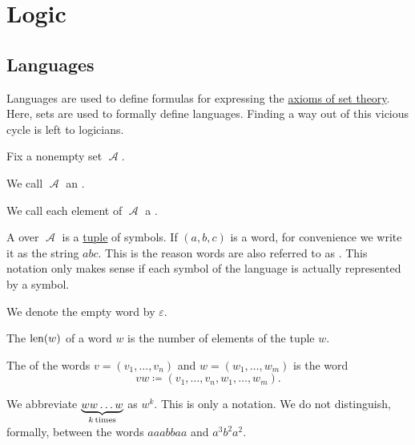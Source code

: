 \section{Logic}\label{sec:logic}
\subsection{Languages}\label{subsec:languages}

\begin{remark}\label{rem:language_definitions_using_sets}
  Languages are used to define formulas for expressing the \hyperref[def:set_zfc]{axioms of set theory}. Here, sets are used to formally define languages. Finding a way out of this vicious cycle is left to logicians.
\end{remark}

\begin{definition}\label{def:language}
  Fix a nonempty set \( \mscrA \).

  \begin{defenum}
     We call \( \mscrA \) an .

     We call each element of \( \mscrA \) a .

     A  over \( \mscrA \) is a \hyperref[def:cartesian_product]{tuple} of symbols. If \( (a, b, c) \) is a word, for convenience we write it as the string \( abc \). This is the reason words are also referred to as . This notation only makes sense if each symbol of the language is actually represented by a symbol.

     We denote the empty word by \( \varepsilon \).

     The  \( \operatorname{len}(w) \) of a word \( w \) is the number of elements of the tuple \( w \).

     The  of the words \( v = (v_1, \ldots, v_n) \) and \( w = (w_1, \ldots, w_m) \) is the word
    \begin{equation*}
      vw \coloneqq (v_1, \ldots, v_n, w_1, \ldots, w_m).
    \end{equation*}

    We abbreviate \( \underbrace{w w \ldots w}_{k \mathop{\text{times}}} \) as \( w^k \). This is only a notation. We do not distinguish, formally, between the words \( aaabbaa \) and \( a^3 b^2 a^2 \).


\end{defenum}
\end{definition}
